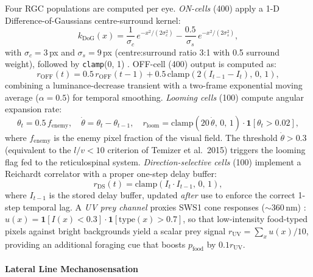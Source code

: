 \documentclass[12pt]{article}
\begin{document}
Four RGC populations are computed per eye.
\textit{ON-cells} (400) apply a 1-D Difference-of-Gaussians
centre-surround kernel:
\begin{equation}\label{eq:dog}
  k_\text{DoG}(x) = \frac{1}{\sigma_c}\,e^{-x^2/(2\sigma_c^2)}
    - \frac{0.5}{\sigma_s}\,e^{-x^2/(2\sigma_s^2)},
\end{equation}
with $\sigma_c = 3$\,px and $\sigma_s = 9$\,px
(centre:surround ratio 3:1 with 0.5 surround weight),
followed by \texttt{clamp}(0, 1) \citep{rodieck1965}.
OFF-cell (400) output is computed as:
\begin{equation}\label{eq:off}
  r_\text{OFF}(t) = 0.5\,r_\text{OFF}(t{-}1)
    + 0.5\,\text{clamp}(2(I_{t-1} - I_t),\,0,\,1),
\end{equation}
combining a luminance-decrease transient with a two-frame
exponential moving average ($\alpha = 0.5$) for temporal smoothing.
\textit{Looming cells} (100) compute angular expansion rate:
\begin{equation}\label{eq:loom}
  \theta_t = 0.5\,f_\text{enemy},\quad
  \dot\theta = \theta_t - \theta_{t-1},\quad
  r_\text{loom} = \text{clamp}(20\,\dot\theta,\,0,\,1)
    \cdot \mathbf{1}[\theta_t > 0.02],
\end{equation}
where $f_\text{enemy}$ is the enemy pixel fraction of the visual field.
The threshold $\dot\theta > 0.3$ (equivalent to the $l/v < 10$ criterion
of Temizer et al.\ 2015) triggers the looming flag fed to the
reticulospinal system.
\textit{Direction-selective cells} (100) implement a Reichardt correlator
with a proper one-step delay buffer:
\begin{equation}\label{eq:ds}
  r_\text{DS}(t) = \text{clamp}(I_t \cdot I_{t-1},\,0,\,1),
\end{equation}
where $I_{t-1}$ is the stored delay buffer, updated \emph{after} use
to enforce the correct 1-step temporal lag.
A \textit{UV prey channel} proxies SWS1 cone responses ($\sim$360\,nm)
\citep{yoshimatsu2020}: $u(x) = \mathbf{1}[I(x) < 0.3] \cdot
\mathbf{1}[\text{type}(x) > 0.7]$, so that low-intensity food-typed
pixels against bright backgrounds yield a scalar prey signal
$r_\text{UV} = \sum_x u(x) / 10$, providing an additional foraging
cue that boosts $p_\text{food}$ by $0.1 r_\text{UV}$.

\paragraph{Lateral Line Mechanosensation}
\end{document}
